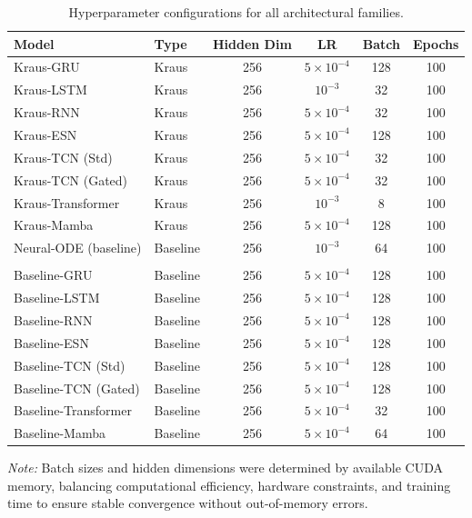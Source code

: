 \documentclass{article} %
\begin{document}
\begin{table}[h]
\centering
\caption{Hyperparameter configurations for all architectural families.}
\label{tab:app_hyperparams}
\small
\begin{tabular}{llcccc}
\toprule
\textbf{Model} & \textbf{Type} & \textbf{Hidden Dim} & \textbf{LR} & \textbf{Batch} & \textbf{Epochs} \\
\midrule
Kraus-GRU & Kraus & 256 & $5 \times 10^{-4}$ & 128 & 100 \\
Kraus-LSTM & Kraus & 256 & $10^{-3}$ & 32 & 100 \\
Kraus-RNN & Kraus & 256 & $5 \times 10^{-4}$ & 32 & 100 \\
Kraus-ESN & Kraus & 256 & $5 \times 10^{-4}$ & 128 & 100 \\
Kraus-TCN (Std) & Kraus & 256 & $5 \times 10^{-4}$ & 32 & 100 \\
Kraus-TCN (Gated) & Kraus & 256 & $5 \times 10^{-4}$ & 32 & 100 \\
Kraus-Transformer & Kraus & 256 & $10^{-3}$ & 8 & 100 \\
Kraus-Mamba & Kraus & 256 & $5 \times 10^{-4}$ & 128 & 100 \\
Neural-ODE (baseline) & Baseline & 256 & $10^{-3}$ & 64 & 100\\
\\
\midrule
Baseline-GRU & Baseline & 256 & $5 \times 10^{-4}$ & 128 & 100 \\
Baseline-LSTM & Baseline & 256 & $5 \times 10^{-4}$ & 128 & 100 \\
Baseline-RNN & Baseline & 256 & $5 \times 10^{-4}$ & 128 & 100 \\
Baseline-ESN & Baseline & 256& $5 \times 10^{-4}$ & 128 & 100 \\
Baseline-TCN (Std) & Baseline & 256 & $5 \times 10^{-4}$ & 128 & 100 \\
Baseline-TCN (Gated) & Baseline & 256 & $5 \times 10^{-4}$ & 128 & 100 \\
Baseline-Transformer & Baseline & 256 & $5 \times 10^{-4}$ & 32 & 100 \\
Baseline-Mamba & Baseline & 256 & $5 \times 10^{-4}$ & 64 & 100 \\
\bottomrule
\end{tabular}
\end{table}

\textit{Note:} Batch sizes and hidden dimensions were determined by available CUDA memory, balancing computational efficiency, hardware constraints, and training time to ensure stable convergence without out-of-memory errors.
\end{document}
